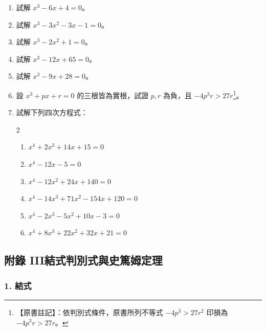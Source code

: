 \begin{enumerate}[label=\arabic*., leftmargin=2em]
  \item 試解 $x^3-6x+4=0$。
  \item 試解 $x^3-3x^2-3x-1=0$。
  \item 試解 $x^3-2x^2+1=0$。
  \item 試解 $x^3-12x+65=0$。
  \item 試解 $x^3-9x+28=0$。
  \item 設 $x^3+px+r=0$ 的三根皆為實根，試證 $p, r$ 為負，且 $-4p^3r > 27r$\label{note:b6-ch2-p117-cubic-ineq}\footnote{【原書註記】：依判別式條件，原書所列不等式 $-4p^3 > 27r^2$ 印損為 $-4p^3r > 27r$。}。
  \item 試解下列四次方程式：
  \begin{multicols}{2}
  \begin{enumerate}[label=(\roman*)]
    \item $x^4+2x^3+14x+15=0$
    \item $x^4-12x-5=0$
    \item $x^4-12x^2+24x+140=0$
    \item $x^4-14x^3+71x^2-154x+120=0$
    \item $x^4-2x^3-5x^2+10x-3=0$
    \item $x^4+8x^3+22x^2+32x+21=0$
  \end{enumerate}
  \end{multicols}
\end{enumerate}

\subsection*{附錄 III\quad 結式判別式與史篤姆定理}\label{sec:b6-app3}
\resetsectcounters

\subsubsection*{1. 結式}\label{subsec:b6-app3-1}

